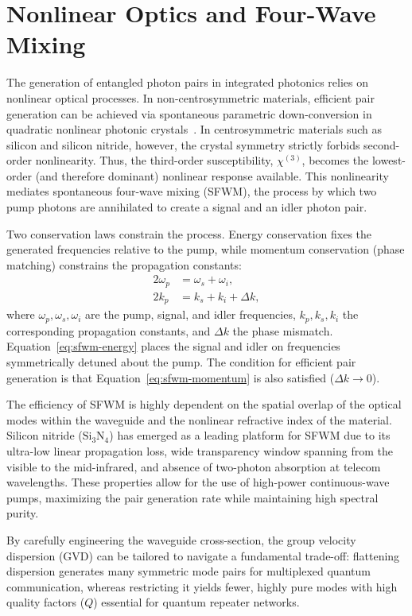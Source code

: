\section{Nonlinear Optics and Four-Wave Mixing}
\label{sec:qsrc-nonlinear}

The generation of entangled photon pairs in integrated photonics relies on nonlinear optical processes. In non-centrosymmetric materials, efficient pair generation can be achieved via spontaneous parametric down-conversion in quadratic nonlinear photonic crystals~\cite{arie2010nonlinear}. In centrosymmetric materials such as silicon and silicon nitride, however, the crystal symmetry strictly forbids second-order nonlinearity. Thus, the third-order susceptibility, $\chi^{(3)}$, becomes the lowest-order (and therefore dominant) nonlinear response available. This nonlinearity mediates spontaneous four-wave mixing (SFWM), the process by which two pump photons are annihilated to create a signal and an idler photon pair.

Two conservation laws constrain the process. Energy conservation fixes the
generated frequencies relative to the pump, while momentum conservation (phase
matching) constrains the propagation constants:
\begin{align}
  2\omega_p &= \omega_s + \omega_i, \label{eq:sfwm-energy}\\
  2k_p &= k_s + k_i + \Delta k, \label{eq:sfwm-momentum}
\end{align}
where $\omega_p,\omega_s,\omega_i$ are the pump, signal, and idler frequencies,
$k_p,k_s,k_i$ the corresponding propagation constants, and $\Delta k$ the phase
mismatch. Equation~\eqref{eq:sfwm-energy} places the signal and idler on
frequencies symmetrically detuned about the pump. The condition for efficient
pair generation is that Equation~\eqref{eq:sfwm-momentum} is also satisfied ($\Delta k \to 0$).

The efficiency of SFWM is highly dependent on the spatial overlap of the optical modes within the waveguide and the nonlinear refractive index of the material. Silicon nitride ($\text{Si}_3\text{N}_4$) has emerged as a leading platform for SFWM due to its ultra-low linear propagation loss, wide transparency window spanning from the visible to the mid-infrared, and absence of two-photon absorption at telecom wavelengths. These properties allow for the use of high-power continuous-wave pumps, maximizing the pair generation rate while maintaining high spectral purity.

By carefully engineering the waveguide cross-section, the group velocity dispersion (GVD) can be tailored to navigate a fundamental trade-off: flattening dispersion generates many symmetric mode pairs for multiplexed quantum communication, whereas restricting it yields fewer, highly pure modes with high quality factors ($Q$) essential for quantum repeater networks.

